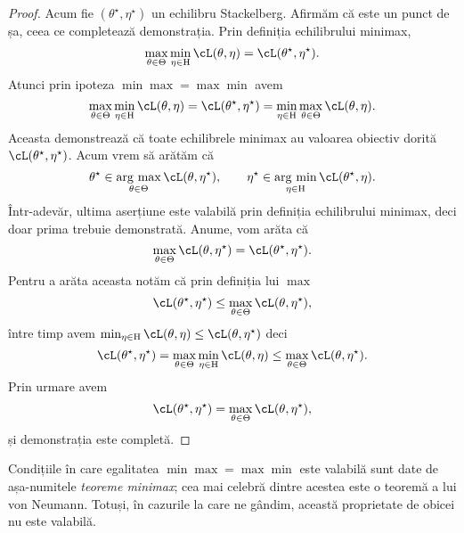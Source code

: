 \documentclass[../../book-main_ro.tex]{subfiles}
\begin{document}
\begin{proof}
    Acum fie \((\theta^{\star}, \eta^{\star})\) un echilibru Stackelberg. Afirmăm că este un punct de șa, ceea ce completează demonstrația. Prin definiția echilibrului minimax,
    \begin{equation}
        \max_{\theta \in \Theta}\min_{\eta \in \Eta}\cL(\theta, \eta) = \cL(\theta^{\star}, \eta^{\star}).
    \end{equation}
    Atunci prin ipoteza \(\min\max = \max\min\) avem
    \begin{equation}
        \max_{\theta \in \Theta}\min_{\eta \in \Eta}\cL(\theta, \eta) = \cL(\theta^{\star}, \eta^{\star}) = \min_{\eta \in \Eta}\max_{\theta \in \Theta}\cL(\theta, \eta).
    \end{equation}
    Aceasta demonstrează că toate echilibrele minimax au valoarea obiectiv dorită \(\cL(\theta^{\star}, \eta^{\star})\). Acum vrem să arătăm că
    \begin{equation}
        \theta^{\star} \in \argmax_{\theta \in \Theta}\cL(\theta, \eta^{\star}), \qquad \eta^{\star} \in \argmin_{\eta \in \Eta}\cL(\theta^{\star}, \eta).
    \end{equation}
    Într-adevăr, ultima aserțiune este valabilă prin definiția echilibrului minimax, deci doar prima trebuie demonstrată. Anume, vom arăta că
    \begin{equation}
        \max_{\theta \in \Theta}\cL(\theta, \eta^{\star}) = \cL(\theta^{\star}, \eta^{\star}).
    \end{equation}
    Pentru a arăta aceasta notăm că prin definiția lui \(\max\)
    \begin{equation}
        \cL(\theta^{\star}, \eta^{\star}) \leq \max_{\theta \in \Theta}\cL(\theta, \eta^{\star}),
    \end{equation}
    între timp avem \(\min_{\eta \in \Eta}\cL(\theta, \eta) \leq \cL(\theta, \eta^{\star})\) deci
    \begin{equation}
        \cL(\theta^{\star}, \eta^{\star}) = \max_{\theta \in \Theta}\min_{\eta \in \Eta}\cL(\theta, \eta) \leq \max_{\theta \in \Theta}\cL(\theta, \eta^{\star}).
    \end{equation}
    Prin urmare avem 
    \begin{equation}
        \cL(\theta^{\star}, \eta^{\star}) = \max_{\theta \in \Theta}\cL(\theta, \eta^{\star}),
    \end{equation}
    și demonstrația este completă.
\end{proof}
Condițiile în care egalitatea \(\min\max = \max\min\) este valabilă sunt date de așa-numitele \textit{teoreme minimax}; cea mai celebră dintre acestea este o teoremă a lui von Neumann. Totuși, în cazurile la care ne gândim, această proprietate de obicei nu este valabilă.
\end{document}
